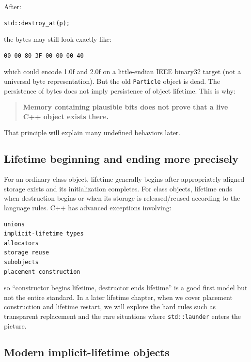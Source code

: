 After:

\begin{verbatim}
std::destroy_at(p);
\end{verbatim}

the bytes may still look exactly like:

\begin{verbatim}
00 00 80 3F 00 00 00 40
\end{verbatim}

which could encode 1.0f and 2.0f on a little-endian IEEE binary32 target (not a universal byte representation). But the old \texttt{Particle} object is dead. The persistence of bytes does not imply persistence of object lifetime. This is why:

\begin{quote}
\textbf{Memory containing plausible bits does not prove that a live C++ object exists there.}
\end{quote}

That principle will explain many undefined behaviors later.

\subsection{Lifetime beginning and ending more precisely}\label{01-foundations-i-ch002-lifetime-beginning-and-ending-more-precisely}

For an ordinary class object, lifetime generally begins after appropriately aligned storage exists and its initialization completes. For class objects, lifetime ends when destruction begins or when its storage is released/reused according to the language rules. C++ has advanced exceptions involving:

\begin{verbatim}
unions
implicit-lifetime types
allocators
storage reuse
subobjects
placement construction
\end{verbatim}

so ``constructor begins lifetime, destructor ends lifetime'' is a good first model but not the entire standard. In a later lifetime chapter, when we cover placement construction and lifetime restart, we will explore the hard rules such as transparent replacement and the rare situations where \texttt{std::launder} enters the picture.

\subsection{Modern implicit-lifetime objects}\label{01-foundations-i-ch002-modern-implicit-lifetime-objects}

